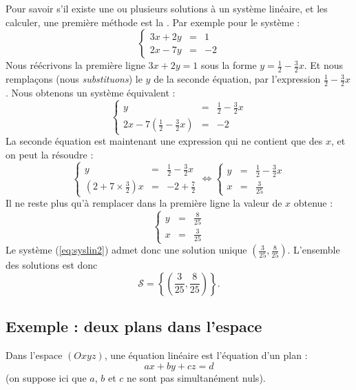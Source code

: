 \documentclass[class=report,crop=false]{standalone}
\begin{document}
Pour savoir s'il existe une ou plusieurs solutions à un système linéaire,
et les calculer, une première méthode est la
.
Par exemple pour le système :
\begin{equation}
\left\{\begin{array}{rcl}
3 x + 2 y & = & 1\\
2 x - 7 y & = & -2
\end{array}\right.
\tag{$S$}
\label{eq:syslin2}
\end{equation}
Nous réécrivons la première ligne $3 x + 2 y  =  1$ sous la forme
$y = \frac12 - \frac32x$. Et nous remplaçons (nous \emph{substituons}) le $y$
de la seconde équation, par l'expression $\frac12 - \frac32x$. Nous obtenons un système
équivalent :
$$\left\{\begin{array}{rcl}
y & = & \frac12 - \frac32x\\
2 x - 7 (\frac12 - \frac32x) & = & -2
\end{array}\right.$$
La seconde équation est maintenant une expression qui ne contient que des $x$, et
on peut la résoudre :
$$\left\{\begin{array}{rcl}
y & = & \frac12 - \frac32x\\
(2+7\times\frac32)x  & = & -2 +\frac72
\end{array}\right.
\iff
\left\{\begin{array}{rcl}
y & = & \frac12 - \frac32x\\
x & = & \frac{3}{25}
\end{array}\right.$$
Il ne reste plus qu'à remplacer dans la première ligne la valeur de $x$ obtenue :
$$\left\{\begin{array}{rcl}
y & = & \frac{8}{25}\\
x & = & \frac{3}{25}
\end{array}\right.$$
Le système (\ref{eq:syslin2}) admet donc une  solution unique $(\frac{3}{25},\frac{8}{25})$.
L'ensemble des solutions est donc
$$\mathcal{S} = \left\lbrace \left(\frac{3}{25},\frac{8}{25}\right) \right\rbrace.$$


\subsection{Exemple : deux plans dans l'espace}

Dans l'espace $(Oxyz)$, une équation linéaire est l'équation d'un plan :
$$a x + b y  + c z = d$$
(on suppose ici que $a$, $b$ et $c$ ne sont pas simultanément nuls).
\end{document}

